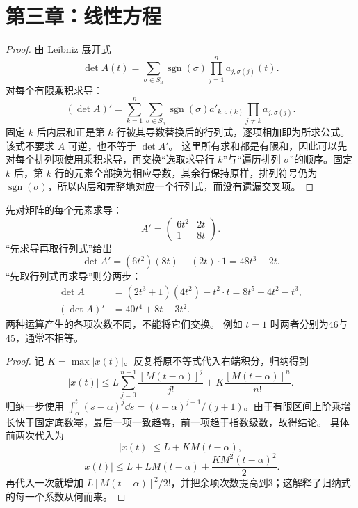 \section{第三章：线性方程}
\begin{proof}
由 Leibniz 展开式
\[
 \det A(t)=\sum_{\sigma\in S_n}\operatorname{sgn}(\sigma)
 \prod_{j=1}^na_{j,\sigma(j)}(t).
\]
对每个有限乘积求导：
\[
 (\det A)'=\sum_{k=1}^n\sum_{\sigma\in S_n}\operatorname{sgn}(\sigma)
 a'_{k,\sigma(k)}\prod_{j\ne k}a_{j,\sigma(j)}.
\]
固定 $k$ 后内层和正是第 $k$ 行被其导数替换后的行列式，逐项相加即为所求公式。该式不要求 $A$ 可逆，也不等于 $\det A'$。
这里所有求和都是有限和，因此可以先对每个排列项使用乘积求导，再交换“选取求导行 $k$”与“遍历排列 $\sigma$”的顺序。固定 $k$ 后，第 $k$ 行的元素全部换为相应导数，其余行保持原样，排列符号仍为 $\operatorname{sgn}(\sigma)$，所以内层和完整地对应一个行列式，而没有遗漏交叉项。
\end{proof}
先对矩阵的每个元素求导：
\[
A'=\begin{pmatrix}6t^2&2t\\1&8t\end{pmatrix}.
\]
“先求导再取行列式”给出
\[
\det A'=(6t^2)(8t)-(2t)\cdot1=48t^3-2t.
\]
“先取行列式再求导”则分两步：
\[
\begin{aligned}
\det A&=(2t^3+1)(4t^2)-t^2\cdot t
=8t^5+4t^2-t^3,\\
(\det A)'&=40t^4+8t-3t^2.
\end{aligned}
\]
两种运算产生的各项次数不同，不能将它们交换。
例如 $t=1$ 时两者分别为46与45，通常不相等。
\begin{proof}
记 $K=\max|x(t)|$。反复将原不等式代入右端积分，归纳得到
\[
 |x(t)|\le L\sum_{j=0}^{n-1}\dfrac{[M(t-\alpha)]^j}{j!}
 +K\dfrac{[M(t-\alpha)]^n}{n!}.
\]
归纳一步使用 $\displaystyle\int_\alpha^t(s-\alpha)^j\dd s=(t-\alpha)^{j+1}/(j+1)$。由于有限区间上阶乘增长快于固定底数幂，最后一项一致趋零，前一项趋于指数级数，故得结论。
具体前两次代入为
\[
|x(t)|\le L+KM(t-\alpha),
\]
\[
|x(t)|\le L+LM(t-\alpha)+\dfrac{KM^2(t-\alpha)^2}{2}.
\]
再代入一次就增加 $L[M(t-\alpha)]^2/2!$，并把余项次数提高到3；这解释了归纳式的每一个系数从何而来。
\end{proof}
